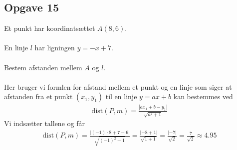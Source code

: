 \subsection{Opgave 15}

Et punkt har koordinatsættet $A(8,6)$.\\\\
En linje $l$ har ligningen $y = -x+7$.\\\\
Bestem afstanden mellem $A$ og $l$.\\\\

\ans
Her bruger vi formlen for afstand mellem et punkt og en linje som siger at afstanden fra et punkt $(x_1,y_1)$ til en linje $y = ax+b$ kan bestemmes ved
\begin{align*}
    \text{dist}(P,m)=\frac{|ax_1+b-y_1|}{\sqrt{a^2 +1}}
\end{align*}
Vi indsætter tallene og får
\begin{align*}
    \text{dist}(P,m)=\frac{|(-1)\cdot 8+7-6|}{\sqrt{(-1)^2 + 1}}= \frac{|-8+1|}{\sqrt{1+1}}=\frac{|-7|}{\sqrt{2}}=\frac{7}{\sqrt{2}}\approx 4.95
\end{align*}